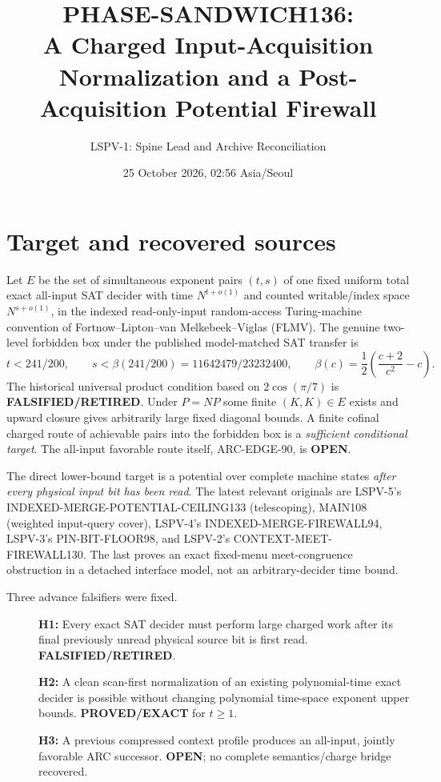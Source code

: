 \documentclass[11pt]{article}
\title{PHASE-SANDWICH136:\\
A Charged Input-Acquisition Normalization and a Post-Acquisition Potential Firewall}
\author{LSPV-1: Spine Lead and Archive Reconciliation}
\date{25 October 2026, 02:56 Asia/Seoul}
\newcommand{\OPEN}{\textbf{OPEN}}
\begin{document}
\maketitle
\begin{center}
\end{center}

\section{Target and recovered sources}
Let $E$ be the set of simultaneous exponent pairs $(t,s)$ of one
fixed uniform total exact all-input SAT decider with time
$N^{t+o(1)}$ and counted writable/index space $N^{s+o(1)}$,
in the indexed read-only-input random-access Turing-machine
convention of Fortnow--Lipton--van Melkebeek--Viglas (FLMV).
The genuine two-level forbidden box under the published
model-matched SAT transfer is
\[
t<241/200,\qquad
s<\beta(241/200)=11642479/23232400,\qquad
\beta(c)=\frac12\left(\frac{c+2}{c^2}-c\right).
\]
The historical universal product condition based on
$2\cos(\pi/7)$ is \textbf{FALSIFIED/RETIRED}.
Under $P=NP$ some finite $(K,K)\in E$ exists and upward
closure gives arbitrarily large fixed diagonal bounds.
A finite cofinal charged route of achievable pairs into
the forbidden box is a \emph{sufficient conditional target}.
The all-input favorable route itself, ARC-EDGE-90, is \OPEN.

The direct lower-bound target is a potential over complete
machine states \emph{after every physical input bit has
been read}. The latest relevant originals are LSPV-5's
INDEXED-MERGE-POTENTIAL-CEILING133 (telescoping),
MAIN108 (weighted input-query cover), LSPV-4's
INDEXED-MERGE-FIREWALL94, LSPV-3's
PIN-BIT-FLOOR98, and LSPV-2's
CONTEXT-MEET-FIREWALL130. The last proves an exact
fixed-menu meet-congruence obstruction in a detached
interface model, not an arbitrary-decider time bound.

Three advance falsifiers were fixed.
\begin{description}
\item[] \textbf{H1:} Every exact SAT decider must perform
large charged work after its final previously unread
physical source bit is first read. \textbf{FALSIFIED/RETIRED}.
\item[] \textbf{H2:} A clean scan-first normalization of
an existing polynomial-time exact decider is possible
without changing polynomial time-space exponent upper
bounds. \textbf{PROVED/EXACT} for $t\ge1$.
\item[] \textbf{H3:} A previous compressed context profile
produces an all-input, jointly favorable ARC successor.
\textbf{OPEN}; no complete semantics/charge bridge recovered.
\end{description}
\end{document}
